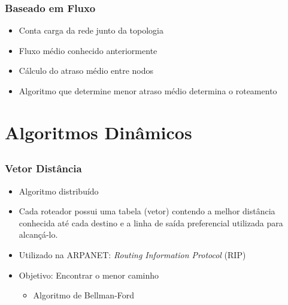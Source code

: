 \documentclass{beamer}
\begin{document}
\begin{frame}
\frametitle{Baseado em Fluxo}
\begin{itemize}
  \setlength{\itemsep}{0.7cm}%
  \item Conta carga da rede junto da topologia
  \item Fluxo médio conhecido anteriormente
  \item Cálculo do atraso médio entre nodos
  \item Algoritmo que determine menor atraso médio determina o roteamento
\end{itemize}
\end{frame}


\section{Algoritmos Dinâmicos}
\subsection{}

\begin{frame}
\frametitle{Vetor Distância}
\begin{itemize}
  \setlength{\itemsep}{0.7cm}%
  \item Algoritmo distribuído
  \item Cada roteador possui uma tabela (vetor) contendo a melhor distância conhecida até cada destino e a linha de saída preferencial utilizada para alcançá-lo.
  \item Utilizado na ARPANET: \emph{Routing Information Protocol} (RIP)
  \item Objetivo: Encontrar o menor caminho
  \begin{itemize}
    \item Algoritmo de Bellman-Ford
  \end{itemize}
\end{itemize}
\end{frame}
\end{document}
